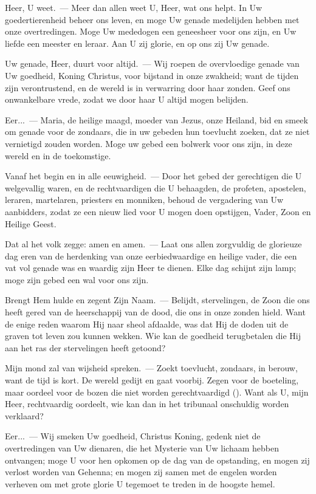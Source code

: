 \documentclass[12pt,twoside,a5paper]{article}
\begin{document}
\begin{halfparskip}
   Heer, U weet.~--- Meer dan allen weet U, Heer, wat ons helpt. In Uw goedertierenheid beheer ons leven, en moge Uw genade medelijden hebben met onze overtredingen. Moge Uw mededogen een geneesheer voor ons zijn, en Uw liefde een meester en leraar. Aan U zij glorie, en op ons zij Uw genade.

  Uw genade, Heer, duurt voor altijd.~--- Wij roepen de overvloedige genade van Uw goedheid, Koning Christus, voor bijstand in onze zwakheid; want de tijden zijn verontrustend, en de wereld is in verwarring door haar zonden. Geef ons onwankelbare vrede, zodat we door haar U altijd mogen belijden.

  Eer...~--- Maria, de heilige maagd, moeder van Jezus, onze Heiland, bid en smeek om genade voor de zondaars, die in uw gebeden hun toevlucht zoeken, dat ze niet vernietigd zouden worden. Moge uw gebed een bolwerk voor ons zijn, in deze wereld en in de toekomstige.

  Vanaf het begin en in alle eeuwigheid.~--- Door het gebed der gerechtigen die U welgevallig waren, en de rechtvaardigen die U behaagden, de profeten, apostelen, leraren, martelaren, priesters en monniken, behoud de vergadering van Uw aanbidders, zodat ze een nieuw lied voor U mogen doen opstijgen, Vader, Zoon en Heilige Geest.

  Dat al het volk zegge: amen en amen.~--- Laat ons allen zorgvuldig de glorieuze dag eren van de herdenking van onze eerbiedwaardige en heilige vader, die een vat vol genade was en waardig zijn Heer te dienen. Elke dag schijnt zijn lamp; moge zijn gebed een wal voor ons zijn.
\end{halfparskip}


\begin{halfparskip}
  Brengt Hem hulde en zegent Zijn Naam.~--- Belijdt, stervelingen, de Zoon die ons heeft gered van de heerschappij van de dood, die ons in onze zonden hield. Want de enige reden waarom Hij naar sheol afdaalde, was dat Hij de doden uit de graven tot leven zou kunnen wekken. Wie kan de goedheid terugbetalen die Hij aan het ras der stervelingen heeft getoond?

  Mijn mond zal van wijsheid spreken.~--- Zoekt toevlucht, zondaars, in berouw, want de tijd is kort. De wereld gedijt en gaat voorbij. Zegen voor de boeteling, maar oordeel voor de bozen die niet worden gerechtvaardigd (). Want als U, mijn Heer, rechtvaardig oordeelt, wie kan dan in het tribunaal onschuldig worden verklaard?

  Eer...~--- Wij smeken Uw goedheid, Christus Koning, gedenk niet de overtredingen van Uw dienaren, die het Mysterie van Uw lichaam hebben ontvangen; moge U voor hen opkomen op de dag van de opstanding, en mogen zij verlost worden van Gehenna; en mogen zij samen met de engelen worden verheven om met grote glorie U tegemoet te treden in de hoogste hemel.
\end{halfparskip}
\end{document}
